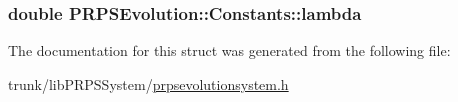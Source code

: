 \hypertarget{struct_p_r_p_s_evolution_1_1_constants_ace86405b7931058d3c8fae37b1fb84ba}{
\subsubsection[{lambda}]{\setlength{\rightskip}{0pt plus 5cm}double {\bf \-P\-R\-P\-S\-Evolution\-::\-Constants\-::lambda}}}\label{struct_p_r_p_s_evolution_1_1_constants_ace86405b7931058d3c8fae37b1fb84ba}


\-The documentation for this struct was generated from the following file\-:\begin{DoxyCompactItemize}
\item 
trunk/lib\-P\-R\-P\-S\-System/\hyperlink{prpsevolutionsystem_8h}{prpsevolutionsystem.\-h}\end{DoxyCompactItemize}

